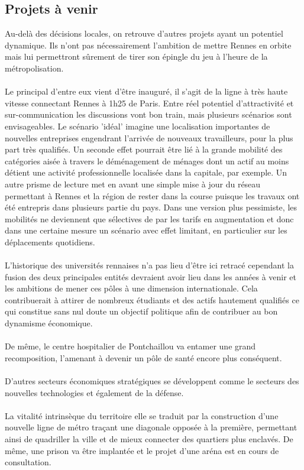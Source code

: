\documentclass{bredele}
\begin{document}
\subsection{Projets à venir}
Au-delà des décisions locales, on retrouve d’autres projets ayant un potentiel dynamique. Ils n’ont pas nécessairement l’ambition de mettre Rennes en orbite mais lui permettront sûrement de tirer son épingle du jeu à l’heure de la métropolisation.
\\\\Le principal d’entre eux vient d’être inauguré, il s’agit de la ligne à très haute vitesse connectant Rennes à 1h25 de Paris. Entre réel potentiel d’attractivité et sur-communication les discussions vont bon train, mais plusieurs scénarios sont envisageables. Le scénario 'idéal' imagine  une localisation importantes de nouvelles entreprises engendrant l’arrivée de nouveaux travailleurs, pour la plus part très qualifiés. Un seconde effet pourrait être lié à la grande mobilité des catégories aisée à travers le déménagement de ménages dont un actif au moins détient une activité professionnelle localisée dans la capitale, par exemple. Un autre prisme de lecture met en avant une simple mise à jour du réseau permettant à Rennes et la région de rester dans la course puisque les travaux ont été entrepris dans plusieurs partie du pays. Dans une version plus pessimiste, les mobilités ne deviennent que sélectives de par les tarifs en augmentation et donc dans une certaine mesure un scénario avec effet limitant, en particulier sur les déplacements quotidiens.
\\\\L’historique des universités rennaises n’a pas lieu d’être ici retracé cependant la fusion des deux principales entités devraient avoir lieu dans les années à venir et les ambitions de mener ces pôles à une dimension internationale.  Cela contribuerait à attirer de nombreux étudiants et des actifs hautement qualifiés ce qui constitue sans nul doute un objectif politique afin de contribuer au bon dynamisme économique.
\\\\De même, le centre hospitalier de Pontchaillou va entamer une grand recomposition, l’amenant à devenir un pôle de santé encore plus conséquent.
\\\\D’autres secteurs économiques stratégiques se développent comme le secteurs des nouvelles technologies et également de la défense.
\\\\La vitalité intrinsèque du territoire elle se traduit par la construction d’une nouvelle ligne de métro traçant une diagonale opposée à la première, permettant ainsi de quadriller la ville et de mieux connecter des quartiers plus enclavés. De même, une prison va être implantée et le projet d’une aréna est en cours de consultation.
\end{document}
